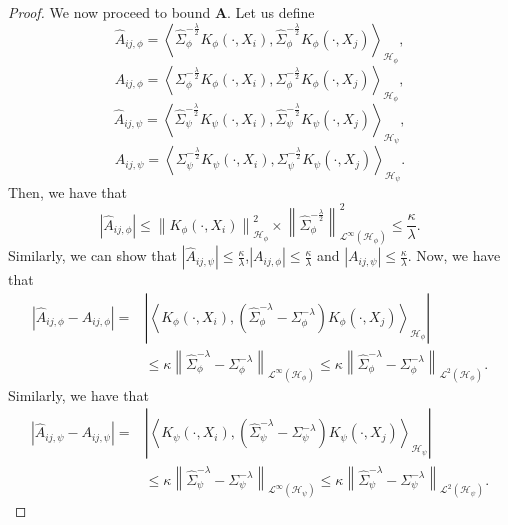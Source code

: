 \documentclass{article} %
\newcommand{\HS}{\mathcal{L}^{2}}
\newcommand{\Op}{\mathcal{L}^{\infty}}
\newcommand{\repone}{\phi}
\newcommand{\reptwo}{\psi}
\newcommand{\Hone}{\mathcal{H}_{\phi}}
\newcommand{\Htwo}{\mathcal{H}_{\psi}}
\newcommand{\norm}[1]{\left\|#1\right\|}
\newcommand{\inprod}[1]{\left \langle #1 \right\rangle}
\theoremstyle{plain}
\begin{document}
\begin{proof}
We now proceed to bound $\mathbf{A}$. Let us define
\[
\hat{A}_{ij,\repone} = \inprod{\hat{\Sigma}_{\repone}^{-\frac{\lambda}{2}}K_{\repone}(\cdot,X_{i}),\hat{\Sigma}_{\repone}^{-\frac{\lambda}{2}}K_{\repone}(\cdot,X_{j})}_{\Hone},
\]
\[
A_{ij,\repone} = \inprod{\Sigma_{\repone}^{-\frac{\lambda}{2}}K_{\repone}(\cdot,X_{i}),\Sigma_{\repone}^{-\frac{\lambda}{2}}K_{\repone}(\cdot,X_{j})}_{\Hone},
\]
\[
\hat{A}_{ij,\reptwo} = \inprod{\hat{\Sigma}_{\reptwo}^{-\frac{\lambda}{2}}K_{\reptwo}(\cdot,X_{i}),\hat{\Sigma}_{\reptwo}^{-\frac{\lambda}{2}}K_{\reptwo}(\cdot,X_{j})}_{\Htwo},
\]
\[
A_{ij,\reptwo} = \inprod{\Sigma_{\reptwo}^{-\frac{\lambda}{2}}K_{\reptwo}(\cdot,X_{i}),\Sigma_{\reptwo}^{-\frac{\lambda}{2}}K_{\reptwo}(\cdot,X_{j})}_{\Htwo}.
\]
Then, we have that 
\[
\left|\hat{A}_{ij,\repone}\right|\leq \norm{K_{\repone}(\cdot,X_{i})}_{\Hone}^{2} \times \norm{\hat{\Sigma}_{\repone}^{-\frac{\lambda}{2}}}_{\Op(\Hone)}^{2}\leq \frac{\kappa}{\lambda}.
\]
Similarly, we can show that $\left|\hat{A}_{ij,\reptwo}\right|\leq \frac{\kappa}{\lambda}$,$\left|A_{ij,\repone}\right|\leq \frac{\kappa}{\lambda}$ and $\left|A_{ij,\reptwo}\right|\leq \frac{\kappa}{\lambda}$. Now, we have that
\[
\begin{aligned}
    \left|\hat{A}_{ij,\repone} - A_{ij,\repone}\right|
    =&\left|\inprod{K_{\repone}(\cdot,X_{i}),\left(\hat{\Sigma}_{\repone}^{-\lambda}-\Sigma_{\repone}^{-\lambda}\right)K_{\repone}(\cdot,X_{j})}_{\Hone}\right|\\
    &\leq \kappa \norm{\hat{\Sigma}_{\repone}^{-\lambda}-\Sigma_{\repone}^{-\lambda}}_{\Op(\Hone)}
    \leq \kappa \norm{\hat{\Sigma}_{\repone}^{-\lambda}-\Sigma_{\repone}^{-\lambda}}_{\HS(\Hone)}.
\end{aligned}
\]
Similarly, we have that
\[
\begin{aligned}
    \left|\hat{A}_{ij,\reptwo} - A_{ij,\reptwo}\right|=&\left|\inprod{K_{\reptwo}(\cdot,X_{i}),\left(\hat{\Sigma}_{\reptwo}^{-\lambda}-\Sigma_{\reptwo}^{-\lambda}\right)K_{\reptwo}(\cdot,X_{j})}_{\Htwo}\right|\\
    &\leq \kappa \norm{\hat{\Sigma}_{\reptwo}^{-\lambda}-\Sigma_{\reptwo}^{-\lambda}}_{\Op(\Htwo)}
    \leq \kappa \norm{\hat{\Sigma}_{\reptwo}^{-\lambda}-\Sigma_{\reptwo}^{-\lambda}}_{\HS(\Htwo)}.
\end{aligned}
\]


\end{proof}
\end{document}
